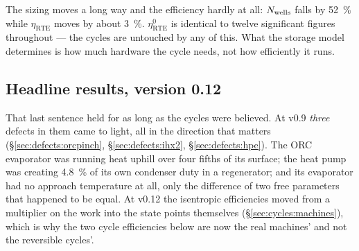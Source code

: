 \noindent The sizing moves a long way and the efficiency hardly at all:
$N_{\mathrm{wells}}$ falls by \SI{52}{\percent} while $\eta_{\mathrm{RTE}}$ moves by about
\SI{3}{\percent}. $\eta_{\mathrm{RTE}}^{0}$ is identical to twelve significant
figures throughout --- the cycles are untouched by any of this. What the storage
model determines is how much hardware the cycle needs, not how efficiently it
runs.

\subsection*{Headline results, version 0.12}

That last sentence held for as long as the cycles were believed. At v0.9
\emph{three} defects in them came to light, all in the direction that matters
(\S\ref{sec:defects:orcpinch}, \S\ref{sec:defects:ihx2},
\S\ref{sec:defects:hpe}). The ORC evaporator was running heat uphill over four
fifths of its surface; the heat pump was creating \SI{4.8}{\percent} of its own
condenser duty in a regenerator; and its evaporator had no approach temperature
at all, only the difference of two free parameters that happened to be equal.
At v0.12 the isentropic efficiencies moved from a multiplier on the work into
the state points themselves (\S\ref{sec:cycles:machines}), which is why the two
cycle efficiencies below are now the real machines' and not the reversible
cycles'.

